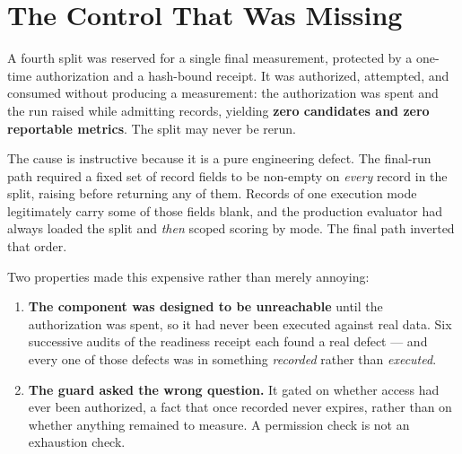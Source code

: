 \documentclass[10pt,conference]{IEEEtran}
\begin{document}
\section{The Control That Was Missing}

A fourth split was reserved for a single final measurement, protected by a
one-time authorization and a hash-bound receipt. It was authorized, attempted,
and consumed without producing a measurement: the authorization was spent and
the run raised while admitting records, yielding \textbf{zero candidates and
zero reportable metrics}. The split may never be rerun.

The cause is instructive because it is a pure engineering defect. The final-run
path required a fixed set of record fields to be non-empty on \emph{every}
record in the split, raising before returning any of them. Records of one
execution mode legitimately carry some of those fields blank, and the production
evaluator had always loaded the split and \emph{then} scoped scoring by mode.
The final path inverted that order.

Two properties made this expensive rather than merely annoying:

\begin{enumerate}
  \item \textbf{The component was designed to be unreachable} until the
        authorization was spent, so it had never been executed against real
        data. Six successive audits of the readiness receipt each found a real
        defect --- and every one of those defects was in something
        \emph{recorded} rather than \emph{executed}.
  \item \textbf{The guard asked the wrong question.} It gated on whether access
        had ever been authorized, a fact that once recorded never expires,
        rather than on whether anything remained to measure. A permission check
        is not an exhaustion check.
\end{enumerate}
\end{document}
